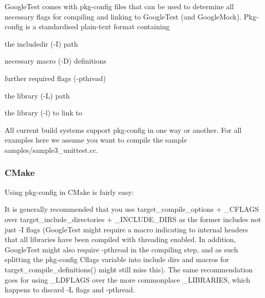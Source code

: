 Google\+Test comes with pkg-\/config files that can be used to determine all necessary flags for compiling and linking to Google\+Test (and Google\+Mock). Pkg-\/config is a standardised plain-\/text format containing


\begin{DoxyItemize}
\item the includedir (-\/I) path
\item necessary macro (-\/D) definitions
\item further required flags (-\/pthread)
\item the library (-\/L) path
\item the library (-\/l) to link to
\end{DoxyItemize}

All current build systems support pkg-\/config in one way or another. For all examples here we assume you want to compile the sample {\ttfamily samples/sample3\+\_\+unittest.\+cc}.

\subsubsection*{C\+Make}

Using {\ttfamily pkg-\/config} in C\+Make is fairly easy\+:


\begin{DoxyCode}{0}
\DoxyCodeLine{}
\DoxyCodeLine{}
\DoxyCodeLine{}
\DoxyCodeLine{}
\end{DoxyCode}


It is generally recommended that you use {\ttfamily target\+\_\+compile\+\_\+options} + {\ttfamily \+\_\+\+C\+F\+L\+A\+GS} over {\ttfamily target\+\_\+include\+\_\+directories} + {\ttfamily \+\_\+\+I\+N\+C\+L\+U\+D\+E\+\_\+\+D\+I\+RS} as the former includes not just -\/I flags (Google\+Test might require a macro indicating to internal headers that all libraries have been compiled with threading enabled. In addition, Google\+Test might also require {\ttfamily -\/pthread} in the compiling step, and as such splitting the pkg-\/config {\ttfamily Cflags} variable into include dirs and macros for {\ttfamily target\+\_\+compile\+\_\+definitions()} might still miss this). The same recommendation goes for using {\ttfamily \+\_\+\+L\+D\+F\+L\+A\+GS} over the more commonplace {\ttfamily \+\_\+\+L\+I\+B\+R\+A\+R\+I\+ES}, which happens to discard {\ttfamily -\/L} flags and {\ttfamily -\/pthread}.

